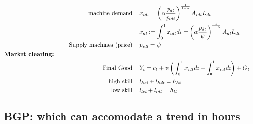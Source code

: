 \begin{align}
\text{machine demand}\hspace{4mm} & x_{idt} = \left(\alpha\frac{ p_{dt}}{p_{idt}}\right)^\frac{1}{1-\alpha}A_{idt}L_{dt}\\
& x_{dt}:=\int_{0}^{1}x_{idt} di= \left(\alpha\frac{p_{dt}}{\psi}\right)^\frac{1}{1-\alpha}A_{dt}L_{dt}\\
\text{Supply machines (price)}\hspace{4mm}& p_{idt}=\psi\\
\text{\textbf{Market clearing:}}\hspace{50mm}& \nonumber\\
\text{Final Good}\hspace{4mm}& Y_{t}=c_t+\psi\left(\int_{0}^1x_{idt}di+\int_{0}^1x_{ict}di\right)+G_t%
\\
\text{high skill}\hspace{4mm}& l_{hct}+l_{hdt}=h_{ht}\\
\text{low skill}\hspace{4mm}&l_{lct}+l_{ldt}=h_{lt}
\end{align}

\subsection{BGP: which can accomodate a trend in hours}


